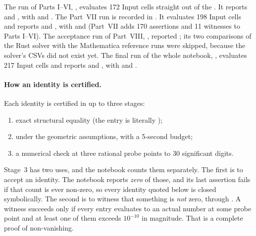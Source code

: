 The run of Parts I--VI, , evaluates 172 Input cells straight
out of the . It reports  and
, with  and
. The Part~VII run is recorded in . It evaluates 198 Input
cells and reports  and , with
 and 
(Part~VII adds 170 assertions and 11 witnesses to Parts I--VI). The acceptance run of Part~VIII,
, reported ;
its two comparisons of the Rust solver with the Mathematica reference runs were skipped, because the
solver's CSVs did not exist yet. The final run of the whole notebook,
, evaluates 217 Input cells and reports
 and , with
 and .

\paragraph{How an identity is certified.} Each identity is certified in up to three stages:
\begin{enumerate}
  \item exact structural equality (the entry is literally );
  \item {} under the geometric assumptions, with a 5-second budget;
  \item a numerical check at three rational probe points to 30 significant digits.
\end{enumerate}
Stage~3 has two uses, and the notebook counts them separately. The first is to accept an
identity. The notebook reports \emph{zero} of those, and its last assertion fails if that count is
ever non-zero, so every identity quoted below is closed symbolically. The second is to witness
that something is \emph{not} zero, through . A witness succeeds only if
every entry evaluates to an actual number at some probe point and at least one of them exceeds
$10^{-10}$ in magnitude. That is a complete proof of non-vanishing.

